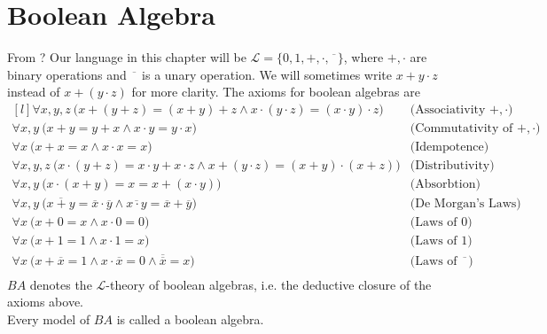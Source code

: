 \chapter{Boolean Algebra}
From \cite{krivine1998théorie}?
Our language in this chapter will be $\mathcal{L} = \{0,1,+,\cdot,\overline{\phantom{x}}\}$, where $+,\cdot$ are binary operations and $\overline{\phantom{x}}$ is a unary operation. We will sometimes write $x+y\cdot z$ instead of $x + (y\cdot z)$ for more clarity.
The axioms for boolean algebras are
\begin{equation*}
    \begin{matrix*}[l]
        \forall x,y,z \: \bigl(x+(y+z) = (x+y)+z \land x\cdot (y\cdot z) = (x \cdot y ) \cdot z\bigr) & \text{(Associativity $+,\cdot$)}\\[3pt]
        \forall x,y \: \bigl(x+y=y+x \land x\cdot y = y\cdot x\bigr) & \text{(Commutativity of $+,\cdot$) }\\[3pt]
        \forall x \: \bigl(x+x = x \land x\cdot x = x\bigr)& \text{(Idempotence) }\\[3pt]
        \forall x,y,z \: \bigl(x\cdot (y+z) = x\cdot y + x\cdot z \land x+(y\cdot z) = (x+y)\cdot (x+z)\bigr) & \text{(Distributivity) }\\[3pt]
        \forall x,y \: \bigl(x\cdot (x+ y) = x  = x+ (x\cdot y) \bigr)& \text{(Absorbtion)}\\[3pt]
        \forall x,y \: \bigl(\overline{x+y} = \overline{x}\cdot \overline{y}\land \overline{x\cdot y} = \overline{x}+ \overline{y}\bigr)& \text{(De Morgan's Laws) }\\[3pt]
        \forall x \: \bigl( x+0 = x \land x\cdot 0 = 0 \bigr)& \text{(Laws of $0$)}\\[3pt]
        \forall x \: \bigl( x+1 = 1\land x\cdot 1 = x \bigr)& \text{(Laws of $1$)}\\[3pt]
        \forall x \: \bigl(x + \overline{x} = 1 \land x\cdot \overline{x} = 0 \land \overline{\overline{x}} = x\bigr)& \text{(Laws of $\overline{\phantom{x}}$)}\\
    \end{matrix*}
\end{equation*}
$BA$ denotes the $\mathcal{L}$-theory of boolean algebras, i.e. the deductive closure of the axioms above.\\%
Every model of $BA$ is called a boolean algebra.

